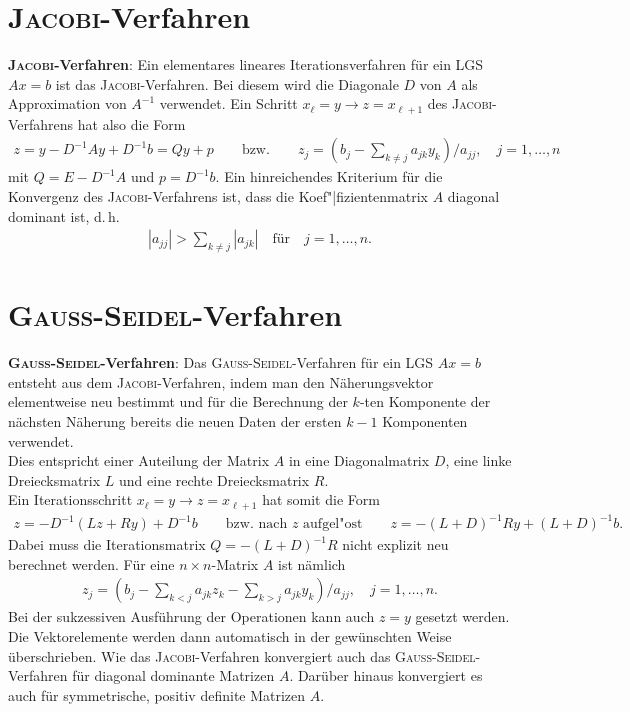 \section{%
    \textsc{Jacobi}-Verfahren%
}

\textbf{\textsc{Jacobi}-Verfahren}:
Ein elementares lineares Iterationsverfahren für ein LGS $Ax = b$ ist
das \textsc{Jacobi}-Verfahren.
Bei diesem wird die Diagonale $D$ von $A$ als Approximation von $A^{-1}$
verwendet.
Ein Schritt $x_\ell = y \rightarrow z = x_{\ell+1}$ des
\textsc{Jacobi}-Verfahrens hat also die Form
\begin{align*}
    z = y - D^{-1}Ay + D^{-1}b = Qy + p \qquad\text{bzw.}\qquad
    z_j = \left(b_j - \sum_{k\not=j} a_{jk}y_k\right) / a_{jj}, \quad
    j = 1, \dotsc, n
\end{align*}
mit $Q = E - D^{-1}A$ und $p = D^{-1}b$.
Ein hinreichendes Kriterium für die Konvergenz des \textsc{Jacobi}-Verfahrens
ist, dass die Koef"|fizientenmatrix $A$ diagonal dominant ist, d.\,h.
\begin{align*}
    |a_{jj}| > \sum_{k\not=j} |a_{jk}| \quad \text{für} \quad j= 1, \dotsc, n.
\end{align*}

\section{%
    \textsc{Gauß}-\textsc{Seidel}-Verfahren%
}

\textbf{\textsc{Gauß}-\textsc{Seidel}-Verfahren}:
Das \textsc{Gauß}-\textsc{Seidel}-Verfahren für ein LGS $Ax = b$ entsteht
aus dem \textsc{Jacobi}-Verfahren, indem man den Näherungsvektor elementweise
neu bestimmt und für die Berechnung der $k$-ten Komponente der nächsten
Näherung bereits die neuen Daten der ersten $k - 1$ Komponenten verwendet. \\
Dies entspricht einer Auteilung der Matrix $A$ in eine Diagonalmatrix $D$,
eine linke Dreiecksmatrix $L$ und eine rechte Dreiecksmatrix $R$. \\
Ein Iterationsschritt $x_\ell = y \rightarrow z = x_{\ell+1}$ hat somit die
Form
\begin{align*}
    z = -D^{-1}(Lz + Ry) + D^{-1}b \qquad\text{bzw. nach } z
    \text{ aufgel"ost}\qquad
    z = -(L + D)^{-1}Ry + (L + D)^{-1}b.
\end{align*}
Dabei muss die Iterationsmatrix $Q = -(L + D)^{-1}R$ nicht explizit neu
berechnet werden.
Für eine $n \times n$-Matrix $A$ ist nämlich
\begin{align*}
    z_j = \left(b_j - \sum_{k<j} a_{jk}z_k - \sum_{k>j} a_{jk}y_k\right)
    / a_{jj}, \quad j= 1, \dotsc, n.
\end{align*}
Bei der sukzessiven Ausführung der Operationen kann auch $z = y$ gesetzt
werden.
Die Vektorelemente werden dann automatisch in der gewünschten Weise
überschrieben.
Wie das \textsc{Jacobi}-Verfahren konvergiert auch das
\textsc{Gauß}-\textsc{Seidel}-Verfahren für diagonal dominante Matrizen $A$.
Darüber hinaus konvergiert es auch für symmetrische, positiv definite
Matrizen $A$.

